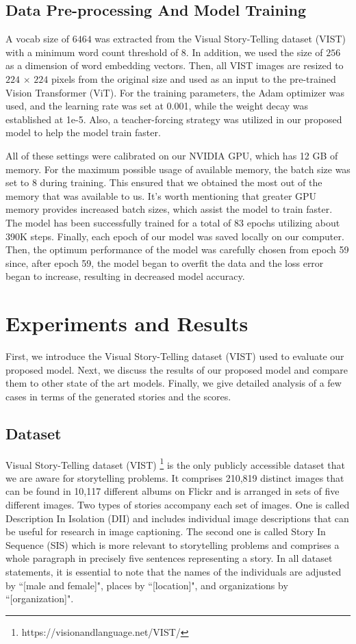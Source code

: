 \documentclass[runningheads]{llncs}
\begin{document}
\subsection{Data Pre-processing And Model Training}
A vocab size of $6464$ was extracted from the Visual Story-Telling dataset (VIST) with a minimum word count threshold of 8. In addition, we used the size of $256$ as a dimension of word embedding vectors. Then, all VIST images are resized to $224$ $\times$ $224$ pixels from the original size and used as an input to the pre-trained Vision Transformer (ViT). For the training parameters, the Adam optimizer was used, and the learning rate was set at 0.001, while the weight decay was established at 1e-5. Also, a teacher-forcing strategy was utilized in our proposed model to help the model train faster. 

All of these settings were calibrated on our NVIDIA GPU, which has 12 GB of memory. For the maximum possible usage of available memory, the batch size was set to 8 during training. This ensured that we obtained the most out of the memory that was available to us. It's worth mentioning that greater GPU memory provides increased batch sizes, which assist the model to train faster. The model has been successfully trained for a total of 83 epochs utilizing about 390K steps. Finally, each epoch of our model was saved locally on our computer. Then, the optimum performance of the model was carefully chosen from epoch 59 since, after epoch 59, the model began to overfit the data and the loss error began to increase, resulting in decreased model accuracy.


\section{Experiments and Results}
First, we introduce the Visual Story-Telling dataset (VIST) used to evaluate our proposed model. Next, we discuss the results of our proposed model and compare them to other state of the art models. Finally, we give detailed analysis of a few cases in terms of the generated stories and the scores.

\subsection{Dataset} \label{datadet}
Visual Story-Telling dataset (VIST) \cite{huang2016visual}\footnote{https://visionandlanguage.net/VIST/} is the only publicly accessible dataset that we are aware for storytelling problems. It comprises 210,819 distinct images that can be found in 10,117 different albums on Flickr and is arranged in sets of five different images. Two types of stories accompany each set of images. One is called Description In Isolation (DII) and includes individual image descriptions that can be useful for research in image captioning. The second one is called Story In Sequence (SIS) which is more relevant to storytelling problems and comprises a whole paragraph in precisely five sentences representing a story. In all dataset statements, it is essential to note that the names of the individuals are adjusted by ``[male and female]", places by ``[location]", and organizations by ``[organization]".
\end{document}
